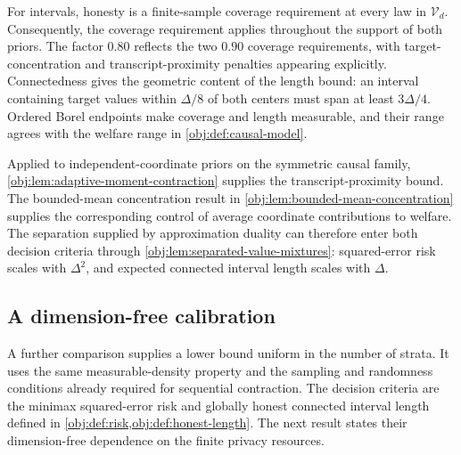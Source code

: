\documentclass[11pt]{article}
\begin{document}
For intervals, honesty is a finite-sample coverage requirement at every law in \(\mathcal V_d\). Consequently, the coverage requirement applies throughout the support of both priors. The factor \(0.80\) reflects the two \(0.90\) coverage requirements, with target-concentration and transcript-proximity penalties appearing explicitly. Connectedness gives the geometric content of the length bound: an interval containing target values within \(\Delta/8\) of both centers must span at least \(3\Delta/4\). Ordered Borel endpoints make coverage and length measurable, and their range agrees with the welfare range in \cref{obj:def:causal-model}.

Applied to independent-coordinate priors on the symmetric causal family, \cref{obj:lem:adaptive-moment-contraction} supplies the transcript-proximity bound. The bounded-mean concentration result in \cref{obj:lem:bounded-mean-concentration} supplies the corresponding control of average coordinate contributions to welfare. The separation supplied by approximation duality can therefore enter both decision criteria through \cref{obj:lem:separated-value-mixtures}: squared-error risk scales with \(\Delta^2\), and expected connected interval length scales with \(\Delta\).

\subsection{A dimension-free calibration}

A further comparison supplies a lower bound uniform in the number of strata. It uses the same measurable-density property and the sampling and randomness conditions already required for sequential contraction. The decision criteria are the minimax squared-error risk and globally honest connected interval length defined in \cref{obj:def:risk,obj:def:honest-length}. The next result states their dimension-free dependence on the finite privacy resources.
\end{document}
